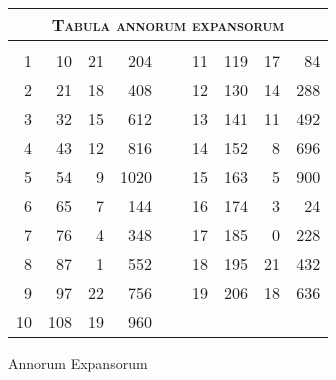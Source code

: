 %
\begin{tabnums} %
\normalsize
\centering
\setlength{\tabcolsep}{1.0ex}
\renewcommand{\arraystretch}{1.030} %
%
\newcommand{\cwd}{3.2em}
\newcommand{\da}{{\scriptsize †}}
\newcommand{\db}{{\scriptsize ‡}}
\newcommand{\ang}{90}
\newcommand{\hsa}[1]{\scriptsize{#1}}
\newcommand{\hsb}[1]{\tiny{#1}}
\newcommand{\hdrA}{%
  ~ & ~ & \multicolumn{3}{c}{\hsa{Arabici}}
}
%
\newcommand{\hdrB}{%
  \ch{888}{\hsb{Anni Iuliani}}&
  \ch{888}{\hsb{Dies}} &
  \hsb{\ch{Horae}{Horae}} &
  \ch{8888}{\hsb{Scru\-puli}}
}
%
\newcommand{\hdrs}{%
 \hdrB & \hspace*{1em} & \hdrB \\
 \cmidrule{1-4} \cmidrule{6-9}
}
%
\begin{tabular}[c]{@{} rrrr c rrrr @{}}
\toprule
\multicolumn{9}{c}{\Large\textsc{Tabula annorum expansorum}} \\
\toprule
\hdrs %
  1 &  10 &  21 &  204 &~&  11 & 119 &  17 &  84 \\
  2 &  21 &  18 &  408 &~&  12 & 130 &  14 & 288 \\
  3 &  32 &  15 &  612 &~&  13 & 141 &  11 & 492 \\
  4 &  43 &  12 &  816 &~&  14 & 152 &   8 & 696 \\
  5 &  54 &   9 & 1020 &~&  15 & 163 &   5 & 900 \\
  6 &  65 &   7 &  144 &~&  16 & 174 &   3 &  24 \\
  7 &  76 &   4 &  348 &~&  17 & 185 &   0 & 228 \\
  8 &  87 &   1 &  552 &~&  18 & 195 &  21 & 432 \\
  9 &  97 &  22 &  756 &~&  19 & 206 &  18 & 636 \\
 10 & 108 &  19 &  960 &~&     &     &     &     \\
\bottomrule
\end{tabular}
\caption{Annorum Expansorum}
\label{tab:p141b}
\end{tabnums}
